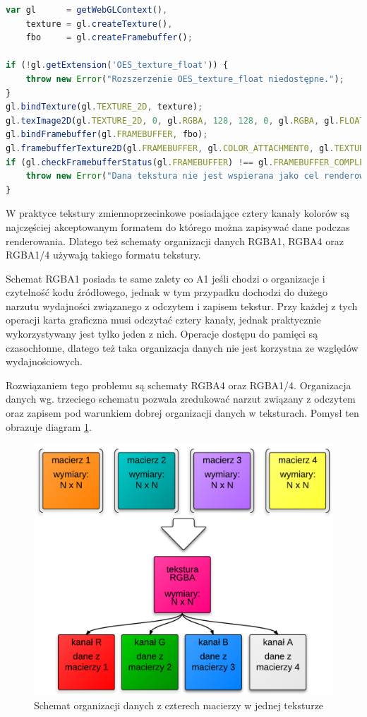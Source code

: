 \begin{lstlisting}[language=JavaScript, caption=Weryfikacja poprawności formatu
i typu tekstury używanej jako cel renderowania]
var gl 		= getWebGLContext(),
	texture = gl.createTexture(),
	fbo 	= gl.createFramebuffer();

if (!gl.getExtension('OES_texture_float')) {
	throw new Error("Rozszerzenie OES_texture_float niedostępne.");
}
gl.bindTexture(gl.TEXTURE_2D, texture);
gl.texImage2D(gl.TEXTURE_2D, 0, gl.RGBA, 128, 128, 0, gl.RGBA, gl.FLOAT, null);
gl.bindFramebuffer(gl.FRAMEBUFFER, fbo);
gl.framebufferTexture2D(gl.FRAMEBUFFER, gl.COLOR_ATTACHMENT0, gl.TEXTURE_2D, texture, 0);
if (gl.checkFramebufferStatus(gl.FRAMEBUFFER) !== gl.FRAMEBUFFER_COMPLETE) {
	throw new Error("Dana tekstura nie jest wspierana jako cel renderowania.");
}
\end{lstlisting}

W praktyce tekstury zmiennoprzecinkowe posiadające cztery kanały kolorów są
najczęściej akceptowanym formatem do którego można zapisywać dane podczas
renderowania. Dlatego też schematy organizacji danych RGBA1, RGBA4 oraz RGBA1/4
używają takiego formatu tekstury.

Schemat RGBA1 posiada te same zalety co A1 jeśli chodzi o organizacje i
czytelność kodu źródłowego, jednak w tym przypadku dochodzi do dużego narzutu
wydajności związanego z odczytem i zapisem tekstur. Przy każdej z tych operacji
karta graficzna musi odczytać cztery kanały, jednak praktycznie wykorzystywany
jest tylko jeden z nich. Operacje dostępu do pamięci są czasochłonne, dlatego
też taka organizacja danych nie jest korzystna ze względów wydajnościowych.

Rozwiązaniem tego problemu są schematy RGBA4 oraz RGBA1/4. Organizacja danych
wg. trzeciego schematu pozwala zredukować narzut związany z odczytem oraz
zapisem pod warunkiem dobrej organizacji danych w teksturach. Pomysł ten
obrazuje diagram \ref{fig:rgba4Tex}. 

\begin{figure}[!p]
\centering
\includegraphics[width=.65\textwidth]{img/rgba4Tex}
\caption{Schemat organizacji danych z czterech macierzy w jednej teksturze}
\label{fig:rgba4Tex}
\end{figure}

